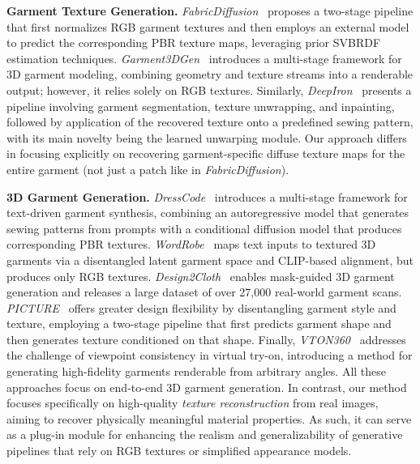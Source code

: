\documentclass[11pt,twocolumn]{article}
\begin{document}
\textbf{Garment Texture Generation.} \textit{FabricDiffusion}~\cite{fabricdiffusion} proposes a two-stage pipeline that first normalizes RGB garment textures 
and then employs an external model to predict the corresponding PBR texture maps, leveraging prior SVBRDF estimation techniques. 
\textit{Garment3DGen}~\cite{garment3dgen} introduces a multi-stage framework for 3D garment modeling, combining geometry and texture streams into a 
renderable output; however, it relies solely on RGB textures. Similarly, \textit{DeepIron}~\cite{deepiron} presents a pipeline involving garment segmentation, 
texture unwrapping, and inpainting, followed by application of the recovered texture onto a predefined sewing pattern, 
with its main novelty being the learned unwarping module. Our approach differs in focusing explicitly on recovering garment-specific diffuse texture maps for the 
entire garment (not just a patch like in \textit{FabricDiffusion}). 

\textbf{3D Garment Generation.}  
\textit{DressCode}~\cite{dresscode} introduces a multi-stage framework for text-driven garment 
synthesis, combining an autoregressive model that generates sewing patterns from prompts with 
a conditional diffusion model that produces corresponding PBR textures. 
\textit{WordRobe}~\cite{WordRobe} maps text inputs to textured 3D garments via a disentangled 
latent garment space and CLIP-based alignment, but produces only RGB textures. 
\textit{Design2Cloth}~\cite{design2cloth} enables mask-guided 3D garment generation and 
releases a large dataset of over 27{,}000 real-world garment scans. 
\textit{PICTURE}~\cite{picture} offers greater design flexibility by disentangling 
garment style and texture, employing a two-stage pipeline that first predicts garment shape
 and then generates texture conditioned on that shape. Finally, \textit{VTON360}~\cite{vton360} 
 addresses the challenge of viewpoint consistency in virtual try-on, introducing a method 
 for generating high-fidelity garments renderable from arbitrary angles.  
All these approaches focus on end-to-end 3D garment generation. 
In contrast, our method focuses specifically on high-quality \textit{texture reconstruction} 
from real images, aiming to recover physically meaningful material properties. 
As such, it can serve as a plug-in module for enhancing the realism and generalizability of 
generative pipelines that rely on RGB textures or simplified appearance models.
\end{document}
